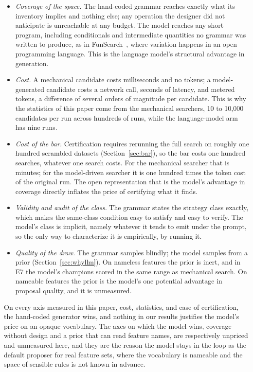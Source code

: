 \documentclass[11pt]{article}
\begin{document}
\begin{itemize}[leftmargin=1.4em]
\item \emph{Coverage of the space.} The hand-coded grammar reaches exactly what its inventory implies
and nothing else; any operation the designer did not anticipate is unreachable at any budget. The model
reaches any short program, including conditionals and intermediate quantities no grammar was written to
produce, as in FunSearch~\cite{funsearch}, where variation happens in an open programming language. This
is the language model's structural advantage in generation.
\item \emph{Cost.} A mechanical candidate costs milliseconds and no tokens; a model-generated candidate
costs a network call, seconds of latency, and metered tokens, a difference of several orders of
magnitude per candidate. This is why the statistics of this paper come from the mechanical searchers, 10 to
10{,}000 candidates per run across hundreds of runs, while the language-model arm has nine runs.
\item \emph{Cost of the bar.} Certification requires rerunning the full search on roughly one hundred
scrambled datasets (Section~\ref{sec:bar}), so the bar costs one hundred searches, whatever one search
costs. For the mechanical searcher that is minutes; for the model-driven searcher it is one hundred
times the token cost of the original run. The open representation that is the model's advantage in
coverage directly inflates the price of certifying what it finds.
\item \emph{Validity and audit of the class.} The grammar states the strategy class exactly, which
makes the same-class condition easy to satisfy and easy to verify. The model's class is implicit,
namely whatever it tends to emit under the prompt, so the only way to characterize it is empirically,
by running it.
\item \emph{Quality of the draw.} The grammar samples blindly; the model samples from a prior
(Section~\ref{sec:whyllm}). On nameless features the prior is inert, and in E7 the model's champions scored in the same range as
mechanical search. On nameable
features the prior is the model's one potential advantage in proposal quality, and it is unmeasured.
\end{itemize}

On every axis measured in this paper, cost, statistics, and ease of certification, the hand-coded
generator wins, and nothing in our results justifies the model's price on an opaque vocabulary. The
axes on which the model wins, coverage without design and a prior that can read feature names, are
respectively unpriced and unmeasured here, and they are the reason the model stays in the loop as the
default proposer for real feature sets, where the vocabulary is nameable and the space of sensible
rules is not known in advance.
\end{document}
